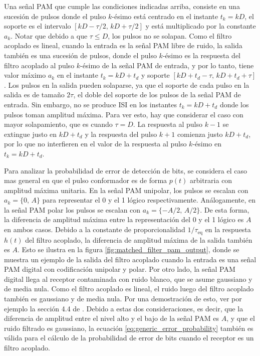 \documentclass[a4paper]{article}
\begin{document}
Una señal PAM que cumple las condiciones indicadas arriba, consiste en una sucesión de pulsos donde el pulso \(k\)-ésimo está centrado en el instante \(t_k=kD\), el soporte es el intervalo \([kD-\tau/2,\,kD+\tau/2]\) y está multiplicado por la constante \(a_k\). Notar que debido a que \(\tau\leq D\), los pulsos no se solapan. Como el filtro acoplado es lineal, cuando la entrada es la señal PAM libre de ruido, la salida también es una sucesión de pulsos, donde el pulso \(k\)-ésimo es la respuesta del filtro acoplado al pulso \(k\)-ésimo de la señal PAM de entrada, y por lo tanto, tiene valor máximo \(a_k\) en el instante \(t_k=kD+t_d\) y soporte \([kD+t_d-\tau,\,kD+t_d+\tau]\). Los pulsos en la salida pueden solaparse, ya que el soporte de cada pulso en la salida es de tamaño \(2\tau\), el doble del soporte de los pulsos de la señal PAM de entrada. Sin embargo, no se produce ISI en los instantes \(t_k=kD+t_d\) donde los pulsos toman amplitud máxima. Para ver esto, hay que considerar el caso con mayor solapamiento, que es cuando \(\tau=D\). La respuesta al pulso \(k-1\) se extingue justo en \(kD+t_d\) y la respuesta del pulso \(k+1\) comienza justo \(kD+t_d\), por lo que no interfieren en el valor de la respuesta al pulso \(k\)-ésimo en \(t_k=kD+t_d\). 

Para analizar la probabilidad de error de detección de bits, se considera el caso mas general en que el pulso conformador es de forma \(p(t)\) arbitraria con amplitud máxima unitaria. En la señal PAM unipolar, los pulsos se escalan con \(a_k=\lbrace 0,\,A\rbrace\) para representar el 0 y el 1 lógico respectivamente. Análogamente, en la señal PAM polar los pulsos se escalan con \(a_k=\lbrace -A/2,\,A/2\rbrace\). De esta forma, la diferencia de amplitud máxima entre la representación del 0 y el 1 lógico es \(A\) en ambos casos. Debido a la constante de proporcionalidad \(1/\tau_\textrm{eq}\) en la respuesta \(h(t)\) del filtro acoplado, la diferencia de amplitud máxima de la salida también es \(A\). Esto se ilustra en la figura \ref{fig:matched_filter_pam_output}, donde se muestra un ejemplo de la salida del filtro acoplado cuando la entrada es una señal PAM digital con codificación unipolar y polar. 
Por otro lado, la señal PAM digital llega al receptor contaminada con ruido blanco, que se asume gaussiano y de media nula. Como el filtro acoplado es lineal, el ruido luego del filtro acoplado también es gaussiano y de media nula. Por una demostración de esto, ver por ejemplo la sección 4.4 de \cite{Proakis2001}. Debido a estas dos consideraciones, es decir, que la diferencia de amplitud entre el nivel alto y el bajo de la señal PAM es \(A\), y que el ruido filtrado es gaussiano, la ecuación \ref{eq:generic_error_probability} también es válida para el cálculo de la probabilidad de error de bits cuando el receptor es un filtro acoplado.
\end{document}
